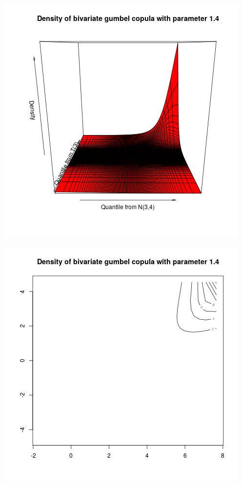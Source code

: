 \documentclass{article}
\begin{document}
\includegraphics{"plot_q2_1"}
\pagebreak

\includegraphics{"plot_q2_2"}
\pagebreak
\end{document}
